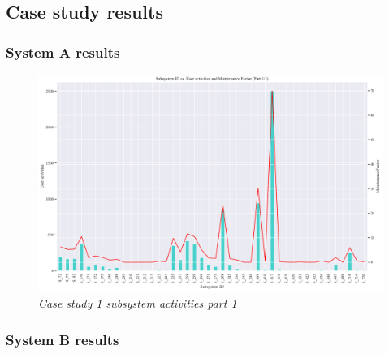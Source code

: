 \subsection{Case study results}

\subsubsection{System A results}

\begin{landscape}
	\begin{figure}[!htb]
		\centering %
		\includegraphics[width=0.95\linewidth]{img/ch3/analysis/case_A_subsystems_1.pdf}
		\caption[Case study 1 subsystem activities part 1]
		{\textit{Case study 1 subsystem activities part 1}}\label{fig:ch3_saS1S246}
	\end{figure} 
\end{landscape}

\subsubsection{System B results}

